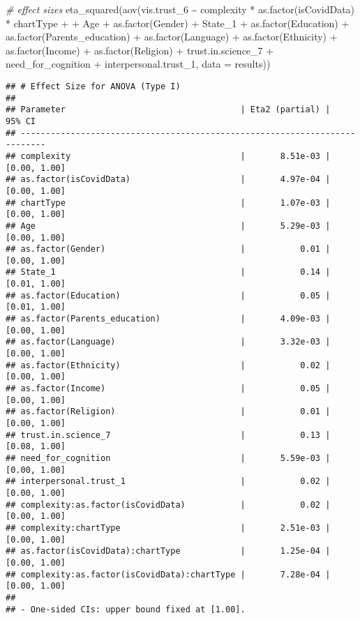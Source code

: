\documentclass[
]{article}
\newenvironment{Shaded}{\begin{snugshade}}{\end{snugshade}}
\newcommand{\AttributeTok}[1]{\textcolor[rgb]{0.77,0.63,0.00}{#1}}
\newcommand{\CommentTok}[1]{\textcolor[rgb]{0.56,0.35,0.01}{\textit{#1}}}
\newcommand{\FunctionTok}[1]{\textcolor[rgb]{0.00,0.00,0.00}{#1}}
\newcommand{\NormalTok}[1]{#1}
\newcommand{\SpecialCharTok}[1]{\textcolor[rgb]{0.00,0.00,0.00}{#1}}
\begin{document}
\begin{Shaded}
\begin{Highlighting}[]
\CommentTok{\# effect sizes}
\FunctionTok{eta\_squared}\NormalTok{(}\FunctionTok{aov}\NormalTok{(vis.trust\_6 }\SpecialCharTok{\textasciitilde{}}\NormalTok{ complexity }\SpecialCharTok{*} \FunctionTok{as.factor}\NormalTok{(isCovidData) }\SpecialCharTok{*}\NormalTok{ chartType }\SpecialCharTok{+} 
                  \SpecialCharTok{+}\NormalTok{ Age }\SpecialCharTok{+} \FunctionTok{as.factor}\NormalTok{(Gender) }\SpecialCharTok{+}\NormalTok{ State\_1 }\SpecialCharTok{+} \FunctionTok{as.factor}\NormalTok{(Education) }\SpecialCharTok{+} \FunctionTok{as.factor}\NormalTok{(Parents\_education) }\SpecialCharTok{+} \FunctionTok{as.factor}\NormalTok{(Language) }\SpecialCharTok{+} \FunctionTok{as.factor}\NormalTok{(Ethnicity) }\SpecialCharTok{+} \FunctionTok{as.factor}\NormalTok{(Income) }\SpecialCharTok{+} \FunctionTok{as.factor}\NormalTok{(Religion) }\SpecialCharTok{+}\NormalTok{ trust.in.science\_7 }\SpecialCharTok{+}\NormalTok{ need\_for\_cognition }\SpecialCharTok{+} 
\NormalTok{                  interpersonal.trust\_1,}
             \AttributeTok{data =}\NormalTok{ results))}
\end{Highlighting}
\end{Shaded}

\begin{verbatim}
## # Effect Size for ANOVA (Type I)
## 
## Parameter                                   | Eta2 (partial) |       95% CI
## ---------------------------------------------------------------------------
## complexity                                  |       8.51e-03 | [0.00, 1.00]
## as.factor(isCovidData)                      |       4.97e-04 | [0.00, 1.00]
## chartType                                   |       1.07e-03 | [0.00, 1.00]
## Age                                         |       5.29e-03 | [0.00, 1.00]
## as.factor(Gender)                           |           0.01 | [0.00, 1.00]
## State_1                                     |           0.14 | [0.01, 1.00]
## as.factor(Education)                        |           0.05 | [0.01, 1.00]
## as.factor(Parents_education)                |       4.09e-03 | [0.00, 1.00]
## as.factor(Language)                         |       3.32e-03 | [0.00, 1.00]
## as.factor(Ethnicity)                        |           0.02 | [0.00, 1.00]
## as.factor(Income)                           |           0.05 | [0.00, 1.00]
## as.factor(Religion)                         |           0.01 | [0.00, 1.00]
## trust.in.science_7                          |           0.13 | [0.08, 1.00]
## need_for_cognition                          |       5.59e-03 | [0.00, 1.00]
## interpersonal.trust_1                       |           0.02 | [0.00, 1.00]
## complexity:as.factor(isCovidData)           |           0.02 | [0.00, 1.00]
## complexity:chartType                        |       2.51e-03 | [0.00, 1.00]
## as.factor(isCovidData):chartType            |       1.25e-04 | [0.00, 1.00]
## complexity:as.factor(isCovidData):chartType |       7.28e-04 | [0.00, 1.00]
## 
## - One-sided CIs: upper bound fixed at [1.00].
\end{verbatim}
\end{document}
